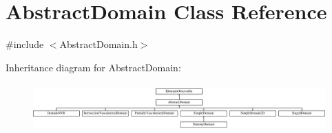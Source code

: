 \hypertarget{class_abstract_domain}{}\section{Abstract\+Domain Class Reference}
\label{class_abstract_domain}


{\ttfamily \#include $<$Abstract\+Domain.\+h$>$}

Inheritance diagram for Abstract\+Domain\+:\begin{figure}[H]
\begin{center}
\leavevmode
\includegraphics[height=1.857380cm]{d2/d71/class_abstract_domain}
\end{center}
\end{figure}
